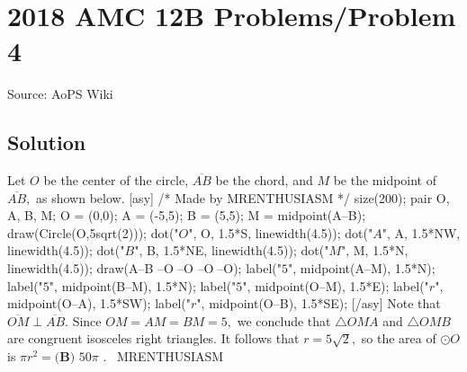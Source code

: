 \documentclass[12pt]{article}
\begin{document}
\section*{{2018 AMC 12B Problems/Problem 4}}
Source: AoPS Wiki

\subsection*{Solution}
Let $O$ be the center of the circle, $\overline{AB}$ be the chord, and $M$ be the midpoint of $\overline{AB},$ as shown below. [asy] /* Made by MRENTHUSIASM */ size(200); pair O, A, B, M; O = (0,0); A = (-5,5); B = (5,5); M = midpoint(A--B); draw(Circle(O,5sqrt(2))); dot("$O$", O, 1.5*S, linewidth(4.5)); dot("$A$", A, 1.5*NW, linewidth(4.5)); dot("$B$", B, 1.5*NE, linewidth(4.5)); dot("$M$", M, 1.5*N, linewidth(4.5)); draw(A--B^^M--O^^A--O^^M--O^^B--O); label("$5$", midpoint(A--M), 1.5*N); label("$5$", midpoint(B--M), 1.5*N); label("$5$", midpoint(O--M), 1.5*E); label("$r$", midpoint(O--A), 1.5*SW); label("$r$", midpoint(O--B), 1.5*SE); [/asy] Note that $\overline{OM}\perp\overline{AB}.$ Since $OM=AM=BM=5,$ we conclude that $\triangle OMA$ and $\triangle OMB$ are congruent isosceles right triangles. It follows that $r=5\sqrt2,$ so the area of $\odot O$ is $\pi r^2=\boxed{\textbf{(B) }50\pi}$ . ~MRENTHUSIASM
\end{document}
